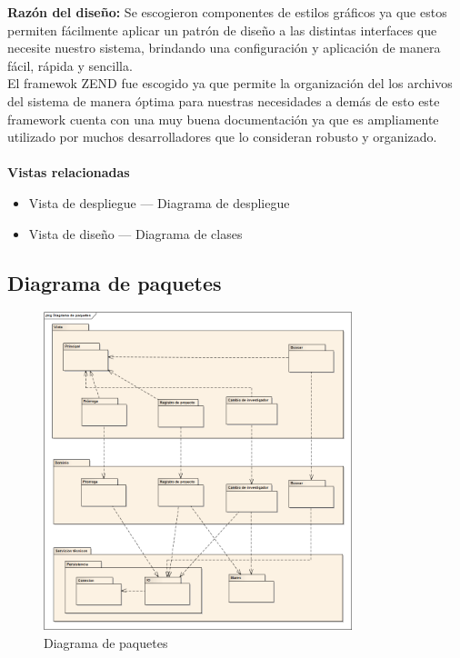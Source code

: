 \documentclass[12pt,oneside,letterpaper]{report}
\begin{document}
\textbf{Razón del diseño:}
Se escogieron componentes de estilos gráficos ya que estos permiten fácilmente aplicar un patrón de diseño a las distintas interfaces que necesite nuestro sistema, brindando una configuración y aplicación de manera fácil, rápida y sencilla.\\
El framewok ZEND fue escogido ya que permite la organización del los archivos del sistema de manera óptima para nuestras necesidades a demás de esto este framework cuenta con una muy buena documentación ya que es ampliamente utilizado por muchos desarrolladores que lo consideran robusto y organizado.\\
\\

\textbf{Vistas relacionadas}
\begin{itemize}
\item Vista de despliegue --- Diagrama de despliegue
\item Vista de diseño --- Diagrama de clases
\end{itemize}

\subsection{Diagrama de paquetes}

\begin{figure}[h!]
  \centering
    \includegraphics[width=0.80\textwidth]{./img/img10.png}
  \caption{Diagrama de paquetes}
\end{figure}
\end{document}
